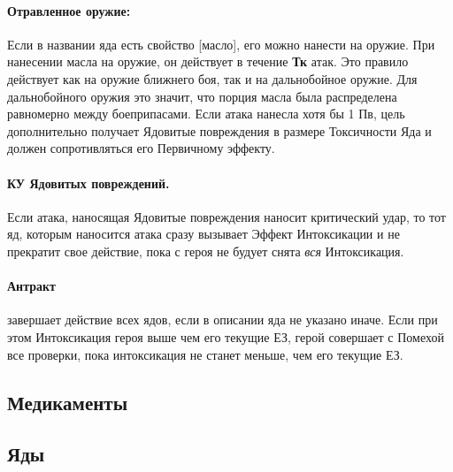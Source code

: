 \paragraph{Отравленное оружие:} Если в названии яда есть свойство [масло], его можно нанести на оружие.
\newline При нанесении масла на оружие, он действует в течение \textbf{Тк} атак. Это правило действует как на оружие ближнего боя, так и на дальнобойное оружие. Для дальнобойного оружия это значит, что порция масла была распределена равномерно между боеприпасами. Если атака нанесла хотя бы 1 Пв, цель дополнительно получает Ядовитые повреждения в размере Токсичности Яда и должен сопротивляться его Первичному эффекту.
\paragraph{КУ Ядовитых повреждений.} Если атака, наносящая Ядовитые повреждения наносит критический удар, то тот яд, которым наносится атака сразу вызывает Эффект Интоксикации и не прекратит свое действие, пока с героя не будует снята \textit{вся} Интоксикация.
\paragraph{Антракт} завершает действие всех ядов, если в описании яда не указано иначе. Если при этом Интоксикация героя выше чем его текущие ЕЗ, герой совершает с Помехой все проверки, пока интоксикация не станет меньше, чем его текущие ЕЗ.

\subsection{Медикаменты}
\subsection{Яды}
